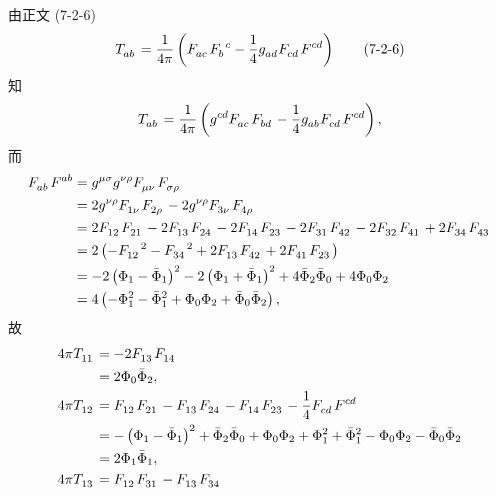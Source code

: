 \begin{xiti}
	\begin{zm}
		由正文 (7-2-6)
		\begin{equation*}
			\tensor{T}{_a_b} = \frac{1}{4\pi} \left( \tensor{F}{_a_c} \tensor{F}{_b^c} - \frac{1}{4} \tensor{g}{_a_d} \tensor{F}{_c_d} \tensor{F}{^c^d} \right) \tag{7-2-6}
		\end{equation*}
		知
		\begin{equation*}
			\tensor{T}{_a_b} = \frac{1}{4\pi} \left( \tensor{g}{^c^d} \tensor{F}{_a_c} \tensor{F}{_b_d} - \frac{1}{4} \tensor{g}{_a_b} \tensor{F}{_c_d} \tensor{F}{^c^d} \right),
		\end{equation*}
		而
		\begin{align*}
			\tensor{F}{_a_b} \tensor{F}{^a^b} &= \tensor{g}{^\mu^\sigma} \tensor{g}{^\nu^\rho} \tensor{F}{_\mu_\nu} \tensor{F}{_\sigma_\rho}\\
			&= 2 \tensor{g}{^\nu^\rho} \tensor{F}{_1_\nu} \tensor{F}{_2_\rho} - 2 \tensor{g}{^\nu^\rho} \tensor{F}{_3_\nu} \tensor{F}{_4_\rho}\\
			&= 2 \tensor{F}{_1_2} \tensor{F}{_2_1} - 2 \tensor{F}{_1_3} \tensor{F}{_2_4} - 2 \tensor{F}{_1_4} \tensor{F}{_2_3} - 2 \tensor{F}{_3_1} \tensor{F}{_4_2} - 2 \tensor{F}{_3_2} \tensor{F}{_4_1} + 2 \tensor{F}{_3_4} \tensor{F}{_4_3}\\
			&= 2 \left( -\tensor{F}{_1_2}^2 - \tensor{F}{_3_4}^2 + 2 \tensor{F}{_1_3} \tensor{F}{_4_2} + 2 \tensor{F}{_4_1} \tensor{F}{_2_3} \right)\\
			&= -2 \left( \Phi_1 - \bar{\Phi}_1 \right)^2 - 2 \left( \Phi_1 + \bar{\Phi}_1 \right)^2 + 4 \bar{\Phi}_2 \bar{\Phi}_0 + 4 \Phi_0 \Phi_2\\
			&= 4 \left( - \Phi_1^2 - \bar{\Phi}_1^2 + \Phi_0 \Phi_2 + \bar{\Phi}_0 \bar{\Phi}_2 \right),
		\end{align*}
		故
		\begin{align*}
			4 \pi \tensor{T}{_1_1} &= - 2 \tensor{F}{_1_3} \tensor{F}{_1_4}\\
			&= 2 \Phi_0 \bar{\Phi}_2,\\
			4 \pi \tensor{T}{_1_2} &= \tensor{F}{_1_2} \tensor{F}{_2_1} - \tensor{F}{_1_3} \tensor{F}{_2_4} - \tensor{F}{_1_4} \tensor{F}{_2_3} - \frac{1}{4} \tensor{F}{_c_d} \tensor{F}{^c^d}\\
			&= - \left( \Phi_1 - \bar{\Phi}_1 \right)^2 + \bar{\Phi}_2 \bar{\Phi}_0 + \Phi_0 \Phi_2 + \Phi_1^2 + \bar{\Phi}_1^2 - \Phi_0 \Phi_2 - \bar{\Phi}_0 \bar{\Phi}_2\\
			&= 2 \Phi_1 \bar{\Phi}_1,\\
			4 \pi \tensor{T}{_1_3} &= \tensor{F}{_1_2} \tensor{F}{_3_1} - \tensor{F}{_1_3} \tensor{F}{_3_4}\\

\end{align*}
\end{zm}
\end{xiti}
